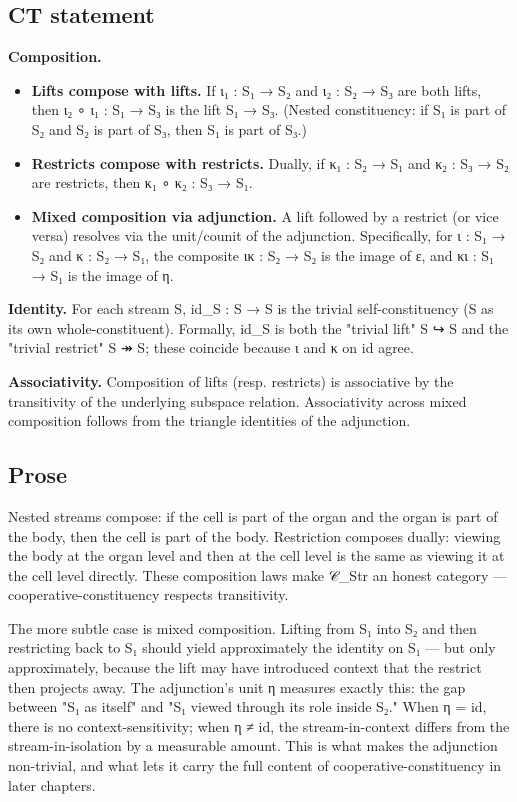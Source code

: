 \documentclass[11pt, openany]{book}
\begin{document}
\subsection{CT statement}

\textbf{Composition.}
\begin{itemize}
\item \textbf{Lifts compose with lifts.} If ι₁ : S₁ → S₂ and ι₂ : S₂ → S₃ are both lifts, then ι₂ ∘ ι₁ : S₁ → S₃ is the lift S₁ → S₃. (Nested constituency: if S₁ is part of S₂ and S₂ is part of S₃, then S₁ is part of S₃.)
\item \textbf{Restricts compose with restricts.} Dually, if κ₁ : S₂ → S₁ and κ₂ : S₃ → S₂ are restricts, then κ₁ ∘ κ₂ : S₃ → S₁.
\item \textbf{Mixed composition via adjunction.} A lift followed by a restrict (or vice versa) resolves via the unit/counit of the adjunction. Specifically, for ι : S₁ → S₂ and κ : S₂ → S₁, the composite ικ : S₂ → S₂ is the image of ε, and κι : S₁ → S₁ is the image of η.
\end{itemize}

\textbf{Identity.} For each stream S, id\_\allowbreak{}S : S → S is the trivial self-constituency (S as its own whole-constituent). Formally, id\_\allowbreak{}S is both the "trivial lift" S ↪ S and the "trivial restrict" S ↠ S; these coincide because ι and κ on id agree.

\textbf{Associativity.} Composition of lifts (resp. restricts) is associative by the transitivity of the underlying subspace relation. Associativity across mixed composition follows from the triangle identities of the adjunction.

\subsection{Prose}

Nested streams compose: if the cell is part of the organ and the organ is part of the body, then the cell is part of the body. Restriction composes dually: viewing the body at the organ level and then at the cell level is the same as viewing it at the cell level directly. These composition laws make 𝒞\_\allowbreak{}Str an honest category --- cooperative-constituency respects transitivity.

The more subtle case is mixed composition. Lifting from S₁ into S₂ and then restricting back to S₁ should yield approximately the identity on S₁ --- but only approximately, because the lift may have introduced context that the restrict then projects away. The adjunction's unit η measures exactly this: the gap between "S₁ as itself" and "S₁ viewed through its role inside S₂." When η = id, there is no context-sensitivity; when η ≠ id, the stream-in-context differs from the stream-in-isolation by a measurable amount. This is what makes the adjunction non-trivial, and what lets it carry the full content of cooperative-constituency in later chapters.
\end{document}

